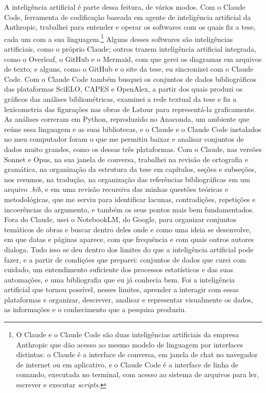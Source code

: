 A inteligência artificial é parte dessa feitura, de vários modos. Com o Claude Code, ferramenta de codificação baseada em agente de inteligência artificial da Anthropic, trabalhei para entender e operar os softwares com os quais fiz a tese, cada um com a sua linguagem.\footnote{O Claude e o Claude Code são duas inteligências artificiais da empresa Anthropic que dão acesso ao mesmo modelo de linguagem por interfaces distintas: o Claude é a interface de conversa, em janela de chat no navegador de internet ou em aplicativo, e o Claude Code é a interface de linha de comando, executada no terminal, com acesso ao sistema de arquivos para ler, escrever e executar \textit{scripts}.} Alguns desses softwares são inteligências artificiais, como o próprio Claude; outros trazem inteligência artificial integrada, como o Overleaf, o GitHub e o Mermaid, com que gerei os diagramas em arquivos de texto; e alguns, como o GitHub e o site da tese, eu sincronizei com o Claude Code. Com o Claude Code também busquei os conjuntos de dados bibliográficos das plataformas SciELO, CAPES e OpenAlex, a partir dos quais produzi os gráficos das análises bibliométricas, examinei a rede textual da tese e fiz a lexicometria das figurações nas obras de Latour para representá-la graficamente. As análises correram em Python, reproduzido no Anaconda, um ambiente que reúne essa linguagem e as suas bibliotecas, e o Claude e o Claude Code instalados no meu computador foram o que me permitiu baixar e analisar conjuntos de dados muito grandes, como os dessas três plataformas. Com o Claude, nas versões Sonnet e Opus, na sua janela de conversa, trabalhei na revisão de ortografia e gramática, na organização da estrutura da tese em capítulos, seções e subseções, nos resumos, na tradução, na organização das referências bibliográficas em um arquivo \textit{.bib}, e em uma revisão recursiva das minhas questões teóricas e metodológicas, que me serviu para identificar lacunas, contradições, repetições e incoerências do argumento, e também os seus pontos mais bem fundamentados. Fora do Claude, usei o NotebookLM, do Google, para organizar conjuntos temáticos de obras e buscar dentro deles onde e como uma ideia se desenvolve, em que datas e páginas aparece, com que frequência e com quais outros autores dialoga. Tudo isso se deu dentro dos limites do que a inteligência artificial pode fazer, e a partir de condições que preparei: conjuntos de dados que curei com cuidado, um entendimento suficiente dos processos estatísticos e das suas automações, e uma bibliografia que eu já conhecia bem. Foi a inteligência artificial que tornou possível, nesses limites, aprender a interagir com essas plataformas e organizar, descrever, analisar e representar visualmente os dados, as informações e o conhecimento que a pesquisa produziu.

